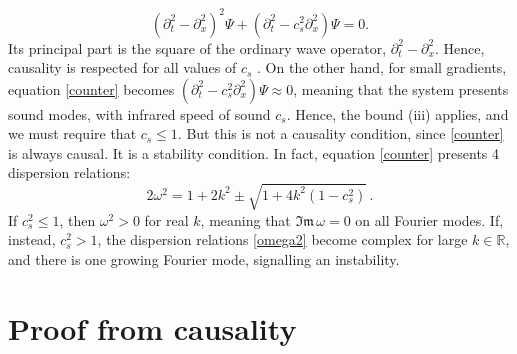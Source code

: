 \documentclass[a4paper, amsfonts, amssymb, amsmath, reprint, showkeys, nofootinbib, twoside,notitlepage]{revtex4-1}
\theoremstyle{definition}
\theoremstyle{theorem}
\theoremstyle{corollary}
\begin{document}
\begin{equation}\label{counter}
(\partial_t^2-\partial^2_x)^2\Psi +(\partial^2_t - c_s^2 \partial^2_x)\Psi=0.
\end{equation}
Its principal part is the square of the ordinary wave operator, $\partial^2_t-\partial^2_x$. Hence, causality is respected for all values of $c_s$ \cite{CourantHilbert2_book,Rauch_book}. On the other hand, for small gradients, equation \eqref{counter} becomes $(\partial^2_t - c_s^2 \partial^2_x)\Psi \approx 0$, meaning that the system presents sound modes, with infrared speed of sound $c_s$. Hence, the bound (iii) applies, and we must require that $c_s \leq 1$. But this is not a causality condition, since \eqref{counter} is always causal. It is a stability condition. In fact, equation \eqref{counter} presents 4 dispersion relations:
\begin{equation}\label{omega2}
2\omega^2 = 1+2k^2 \pm \sqrt{1+4k^2(1-c_s^2)} \, .
\end{equation}
If $c_s^2 \leq 1$, then $\omega^2>0$ for real $k$, meaning that $\mathfrak{Im} \, \omega=0$ on all Fourier modes. If, instead, $c_s^2>1$, the dispersion relations \eqref{omega2} become complex for large $k \in \mathbb{R}$, and there is one growing Fourier mode, signalling an instability.


\section{Proof from causality}
\end{document}

